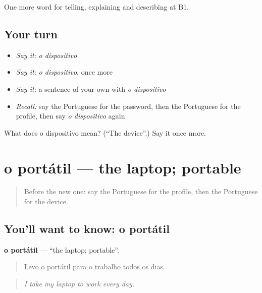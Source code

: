 \begin{grammarlens}[title={What you've built}]
One more word for telling, explaining and describing at B1.
\end{grammarlens}

\subsection*{Your turn}
\begin{itemize}
\raggedright
  \item \emph{Say it:} \emph{o dispositivo}
  \item \emph{Say it:} \emph{o dispositivo}, once more
  \item \emph{Say it:} a sentence of your own with \emph{o dispositivo}
  \item \emph{Recall:} say the Portuguese for the password, then the Portuguese for the profile, then say \emph{o dispositivo} again
\end{itemize}

\begin{tcolorbox}[breakable,colback=teal!4,colframe=teal!35!black,title={Before you move on}]
What does o dispositivo mean? (\textquotedblleft{}The device\textquotedblright{}.) Say it once more.
\end{tcolorbox}
\section[o portátil]{o portátil — the laptop; portable}

\label{lesson:PT-C397-portatil}



\begin{quote}
Before the new one: say the Portuguese for the profile, then the Portuguese for the device.
\end{quote}

\subsection*{You'll want to know: o portátil}
\textbf{o portátil} — \textquotedblleft{}the laptop; portable\textquotedblright{}.

\begin{quote}
Levo o portátil para o trabalho todos os dias.
\end{quote}

\begin{quote}
\emph{I take my laptop to work every day.}
\end{quote}

